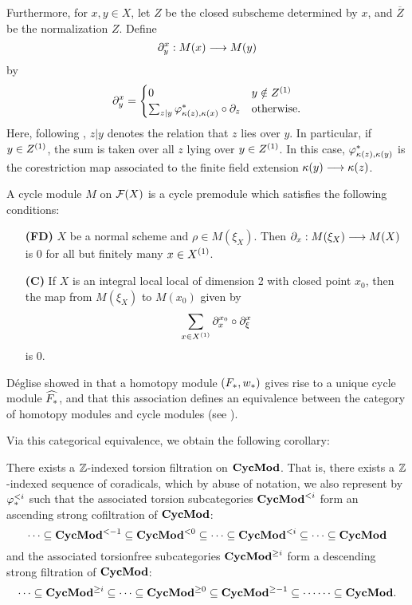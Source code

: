 Furthermore, for $x, y \in X$, let $Z$ be the closed subscheme 
determined by $x$, and $\overline{Z}$ be the normalization $Z$.
Define
\[
\ptres{x}{y}: M(x) \to M(y)
\]
by
\[
\ptres{x}{y} = 
\begin{cases}
0 & y \notin \subsch{1}{Z} \\
\sum_{z|y} \phi_{\resf{z},\resf{x}}^* \comp \res{z} & \textrm{otherwise}.
\end{cases}
\]
Here, following \cite{Rost96}, $z|y$ denotes the relation that $z$ 
lies over $y$. In particular, if $y \in \subsch{1}{Z}$, the sum 
is taken over all $z$ lying over $y \in \subsch{1}{Z}$. In this
case, $\phi_{\resf{z},\resf{y}}^*$ is the corestriction map 
associated to the finite field extension $\resf{y} \to \resf{z}$.

\begin{defn}
A cycle module $M$ on $\fields(X)$ is a cycle premodule which
satisfies the following conditions:

\begin{enumerate}
\item[\textbf{(FD)}]  
$X$ be a normal scheme and $\rho \in M(\xi_X)$. Then $\res{x}: 
M(\xi_X) \to M(X)$ is 0 for all but finitely many $x \in 
\subsch{1}{X}$.

\item[\textbf{(C)}]  If $X$ is an integral
local local of dimension 2 with closed point $x_0$, then the map 
from $M(\xi_X)$ to $M(x_0)$ given by
\[
\sum_{x \in \subsch{1}{X}} \ptres{x_0}{x} \comp \ptres{x}{\xi}
\]
is 0.
\end{enumerate}
\end{defn}

D\'eglise showed in \cite{DegModHom} that a homotopy module $(F_*, 
\deloop_*)$ gives rise to a unique cycle module $\assocCM{F_*}$,
and that this association defines an equivalence between the 
category of homotopy modules and cycle modules (see 
\cite[3.7]{DegModHom}).

Via this categorical equivalence, we obtain the following
corollary: 
\begin{cor}\label{cor_tor_filt_on_CycMod}
There exists a $\Z$-indexed torsion filtration on $\CycMod$. That
is, there exists a $\Z$-indexed sequence of coradicals, which by abuse
of notation, we also represent by $\tlHM{i}$ such that the 
associated torsion subcategories $\TFCycMod{i}$ form an ascending 
strong cofiltration of $\CycMod$:
\[
\cdots \subseteq \TFCycMod{-1} \subseteq \TFCycMod{0} \subseteq \cdots 
   \subseteq \TFCycMod{i} \subseteq \cdots 
   \subseteq \CycMod
\]
and the associated torsionfree subcategories $\TCycMod{i}$
form a descending strong filtration of $\CycMod$:
\[
\cdots \subseteq \TCycMod{i} \subseteq 
   \cdots \subseteq \TCycMod{0} \subseteq \TCycMod{-1} \subseteq \cdots
   \cdots \subseteq \CycMod.
\]
\end{cor}

